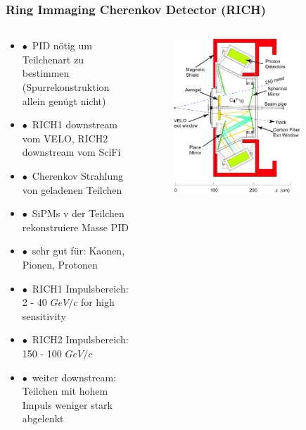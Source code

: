 \documentclass[aspectratio=1610, 12pt, xcolor=dvipsnames]{beamer}
\begin{document}
\begin{frame}\frametitle{Ring Immaging Cherenkov Detector (RICH)}
  \begin{columns}
    \begin{column}[c]{0.48\textwidth}
      \begin{itemize}
        \item $\bullet$\, PID nötig um Teilchenart zu bestimmen (Spurrekonstruktion allein genügt nicht)
        \item $\bullet$\, RICH1 downstream vom VELO, RICH2 downstream vom SciFi
        \item $\bullet$\, Cherenkov Strahlung von geladenen Teilchen
        \item $\bullet$\, SiPMs \to v der Teilchen \to rekonstruiere Masse \to PID
        \item $\bullet$\, sehr gut für: Kaonen, Pionen, Protonen
        \item $\bullet$\, RICH1 Impulsbereich: 2 - 40 $GeV/c$ for high sensitivity
        \item $\bullet$\, RICH2 Impulsbereich: 150 - 100 $GeV/c$
        \item $\bullet$\, weiter downstream: Teilchen mit hohem Impuls weniger stark abgelenkt
      \end{itemize}
    \end{column}
    \begin{column}[c]{0.48\textwidth}
      \begin{figure}
	       \centering
	       \includegraphics[width=0.8\textwidth]{plots/rich1.png}
      \end{figure}
    \end{column}
  \end{columns}
\end{frame}
\end{document}
